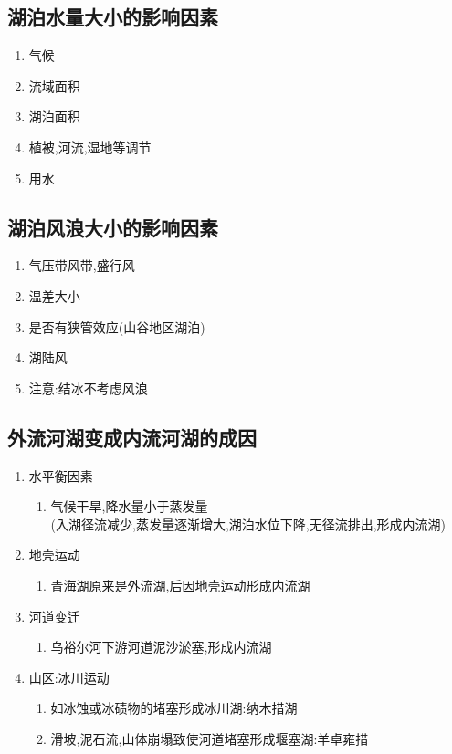 \documentclass[a4paper]{article}
\begin{document}
    \subsection{湖泊水量大小的影响因素}
    \begin{enumerate}
        \item 气候
        \item 流域面积
        \item 湖泊面积
        \item 植被,河流,湿地等调节
        \item 用水
    \end{enumerate}
    \subsection{湖泊风浪大小的影响因素}
    \begin{enumerate}
        \item 气压带风带,盛行风
        \item 温差大小
        \item 是否有狭管效应(山谷地区湖泊)
        \item 湖陆风
        \item 注意:结冰不考虑风浪
    \end{enumerate}
    \subsection{外流河湖变成内流河湖的成因}
    \begin{enumerate}
        \item 水平衡因素
        \begin{enumerate}
            \item 气候干旱,降水量小于蒸发量\\(入湖径流减少,蒸发量逐渐增大,湖泊水位下降,无径流排出,形成内流湖)
        \end{enumerate}
        \item 地壳运动
        \begin{enumerate}
            \item 青海湖原来是外流湖,后因地壳运动形成内流湖
        \end{enumerate}
        \item 河道变迁
        \begin{enumerate}
            \item 乌裕尔河下游河道泥沙淤塞,形成内流湖
        \end{enumerate}
        \item 山区:冰川运动
        \begin{enumerate}
            \item 如冰蚀或冰碛物的堵塞形成冰川湖:纳木措湖
            \item 滑坡,泥石流,山体崩塌致使河道堵塞形成堰塞湖:羊卓雍措
        \end{enumerate}
    \end{enumerate}
\end{document}
